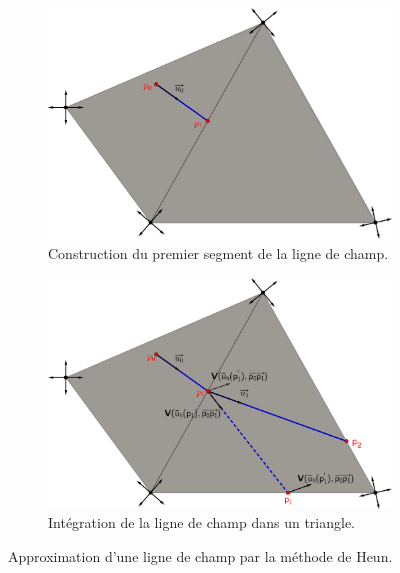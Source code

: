 \begin{figure}[!h]
     \centering
     \begin{subfigure}[b]{0.7\textwidth}
         \centering
         \includegraphics[width=\textwidth]{images/draw_streams_11.pdf}
         \caption{Construction du premier segment de la ligne de champ.}
     \end{subfigure}
     \begin{subfigure}[b]{0.7\textwidth}
         \centering
         \includegraphics[width=\textwidth]{images/draw_streams_12.pdf}
         \caption{Intégration de la ligne de champ dans un triangle.}
     \end{subfigure}
        \caption{Approximation d'une ligne de champ par la méthode de Heun.}
        \label{fig:draw_streams_1}
\end{figure}

